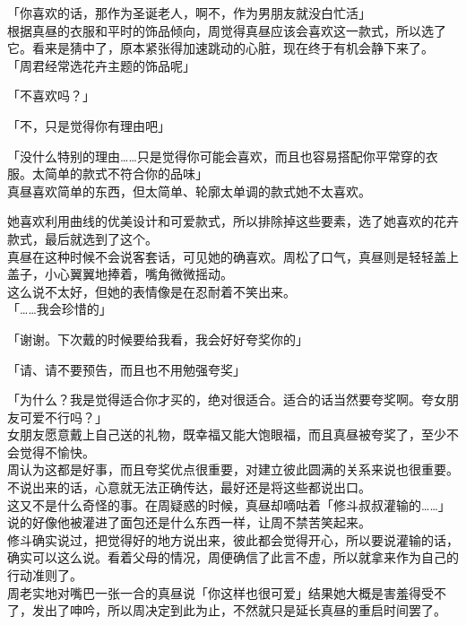 「你喜欢的话，那作为圣诞老人，啊不，作为男朋友就没白忙活」\\

根据真昼的衣服和平时的饰品倾向，周觉得真昼应该会喜欢这一款式，所以选了它。看来是猜中了，原本紧张得加速跳动的心脏，现在终于有机会静下来了。\\

「周君经常选花卉主题的饰品呢」

「不喜欢吗？」

「不，只是觉得你有理由吧」

「没什么特别的理由……只是觉得你可能会喜欢，而且也容易搭配你平常穿的衣服。太简单的款式不符合你的品味」\\

真昼喜欢简单的东西，但太简单、轮廓太单调的款式她不太喜欢。

她喜欢利用曲线的优美设计和可爱款式，所以排除掉这些要素，选了她喜欢的花卉款式，最后就选到了这个。\\

真昼在这种时候不会说客套话，可见她的确喜欢。周松了口气，真昼则是轻轻盖上盖子，小心翼翼地捧着，嘴角微微摇动。\\

这么说不太好，但她的表情像是在忍耐着不笑出来。\\

「……我会珍惜的」

「谢谢。下次戴的时候要给我看，我会好好夸奖你的」

「请、请不要预告，而且也不用勉强夸奖」

「为什么？我是觉得适合你才买的，绝对很适合。适合的话当然要夸奖啊。夸女朋友可爱不行吗？」\\

女朋友愿意戴上自己送的礼物，既幸福又能大饱眼福，而且真昼被夸奖了，至少不会觉得不愉快。\\

周认为这都是好事，而且夸奖优点很重要，对建立彼此圆满的关系来说也很重要。不说出来的话，心意就无法正确传达，最好还是将这些都说出口。\\

这又不是什么奇怪的事。在周疑惑的时候，真昼却嘀咕着「修斗叔叔灌输的……」说的好像他被灌进了面包还是什么东西一样，让周不禁苦笑起来。\\

修斗确实说过，把觉得好的地方说出来，彼此都会觉得开心，所以要说灌输的话，确实可以这么说。看着父母的情况，周便确信了此言不虚，所以就拿来作为自己的行动准则了。\\

周老实地对嘴巴一张一合的真昼说「你这样也很可爱」结果她大概是害羞得受不了，发出了呻吟，所以周决定到此为止，不然就只是延长真昼的重启时间罢了。\\

